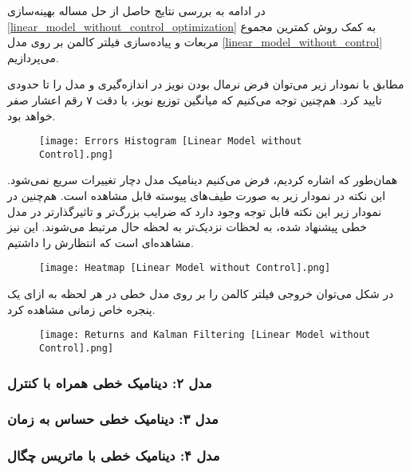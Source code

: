 \documentclass{scribe-cgenomics}
\begin{document}
در ادامه به بررسی نتایج حاصل از حل مساله بهینه‌سازی
\ref{linear_model_without_control_optimization}
به کمک روش کمترین مجموع مربعات و پیاده‌سازی فیلتر کالمن بر روی مدل
\ref{linear_model_without_control}
می‌پردازیم.

\begin{مشاهده}
مطابق با نمودار زیر می‌توان فرض نرمال بودن نویز در اندازه‌گیری و مدل را تا حدودی تایید کرد. هم‌چنین توجه می‌کنیم که میانگین توزیع نویز، با دقت ۷ رقم اعشار صفر خواهد بود.

\begin{figure}[h]
\texttt{[image: Errors Histogram [Linear Model without Control].png]}
\centering
\end{figure}
\end{مشاهده}

\begin{مشاهده}
همان‌طور که اشاره کردیم، فرض می‌کنیم دینامیک مدل دچار تغییرات سریع نمی‌شود. این نکته در نمودار زیر به صورت طیف‌های پیوسته قابل مشاهده است. هم‌چنین در نمودار زیر این نکته قابل توجه وجود دارد که ضرایب بزرگ‌تر و تاثیرگذارتر در مدل خطی پیشنهاد شده، به لحظات نزدیک‌تر به لحظه حال مرتبط می‌شوند. این نیز مشاهده‌ای است که انتظارش را داشتیم.

\begin{figure}[h]
\texttt{[image: Heatmap [Linear Model without Control].png]}
\centering
\end{figure}
\end{مشاهده}

\begin{نتیجه}
در شکل می‌توان خروجی فیلتر کالمن را بر روی مدل خطی در هر لحظه به ازای یک پنجره خاص زمانی مشاهده کرد.

\begin{figure}[h]
\texttt{[image: Returns and Kalman Filtering [Linear Model without Control].png]}
\centering
\end{figure}
\end{نتیجه}

\subsubsection{مدل ۲: دینامیک خطی همراه با کنترل}

\subsubsection{مدل ۳: دینامیک خطی حساس به زمان}

\subsubsection{مدل ۴: دینامیک خطی با ماتریس چگال}
\end{document}
